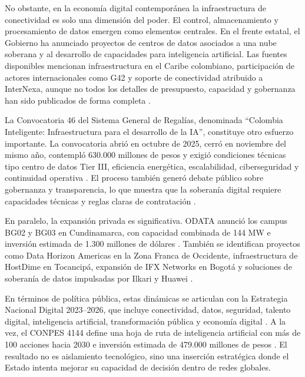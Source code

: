 \documentclass[9pt,letterpaper,twocolumn,twoside,apabib]{rho-class/rho}
\begin{document}
No obstante, en la economía digital contemporánea la infraestructura de conectividad es solo una dimensión del poder. El control, almacenamiento y procesamiento de datos emergen como elementos centrales. En el frente estatal, el Gobierno ha anunciado proyectos de centros de datos asociados a una nube soberana y al desarrollo de capacidades para inteligencia artificial. Las fuentes disponibles mencionan infraestructura en el Caribe colombiano, participación de actores internacionales como G42 y soporte de conectividad atribuido a InterNexa, aunque no todos los detalles de presupuesto, capacidad y gobernanza han sido publicados de forma completa \parencite{dcd_colombia_emiratos_datacenters_2025,presidencia_data_center_santa_marta_2025,minciencias_revolucion_cientifica_2025}.

La Convocatoria 46 del Sistema General de Regalías, denominada ``Colombia Inteligente: Infraestructura para el desarrollo de la IA'', constituye otro esfuerzo importante. La convocatoria abrió en octubre de 2025, cerró en noviembre del mismo año, contempló 630.000 millones de pesos y exigió condiciones técnicas tipo centro de datos Tier III, eficiencia energética, escalabilidad, ciberseguridad y continuidad operativa \parencite{minciencias_colombia_inteligente_2025}. El proceso también generó debate público sobre gobernanza y transparencia, lo que muestra que la soberanía digital requiere capacidades técnicas y reglas claras de contratación \parencite{lorduy_colombia_inteligente_2026}.

En paralelo, la expansión privada es significativa. ODATA anunció los campus BG02 y BG03 en Cundinamarca, con capacidad combinada de 144 MW e inversión estimada de 1.300 millones de dólares \parencite{dcd_odata_data_centers_2024,lorduy_odata_hub_tecnologia_2024}. También se identifican proyectos como Data Horizon Americas en la Zona Franca de Occidente, infraestructura de HostDime en Tocancipá, expansión de IFX Networks en Bogotá y soluciones de soberanía de datos impulsadas por Ilkari y Huawei \parencite{say_global_2026,hostdime_colombia_data_center_2026,smith_internexa_hostdime_2025,itsitio_ifx_data_center_2023,ilkari_huawei_data_center_2024}.

En términos de política pública, estas dinámicas se articulan con la Estrategia Nacional Digital 2023--2026, que incluye conectividad, datos, seguridad, talento digital, inteligencia artificial, transformación pública y economía digital \parencite{mintic_estrategia_nacional_digital_2023}. A la vez, el CONPES 4144 define una hoja de ruta de inteligencia artificial con más de 100 acciones hacia 2030 e inversión estimada de 479.000 millones de pesos \parencite{vanegas_conpes_4144_2025}. El resultado no es aislamiento tecnológico, sino una inserción estratégica donde el Estado intenta mejorar su capacidad de decisión dentro de redes globales.
\end{document}
